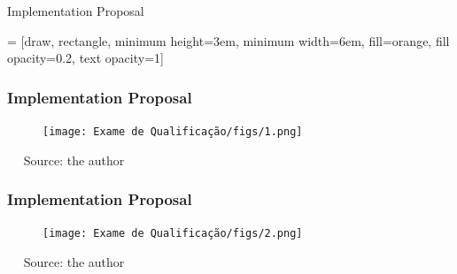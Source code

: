 \documentclass[xcolor=table]{beamer}
\begin{document}
\begin{frame}{Implementation Proposal}
	
	\centering
	
 = [draw, rectangle, 
    minimum height=3em, minimum width=6em, fill=orange, fill opacity=0.2, text opacity=1]

\end{frame}

%

\begin{frame}\frametitle{Implementation Proposal} 

	\begin{figure}[htb]
		\centering
		\texttt{[image: Exame de Qualificação/figs/1.png]}
		\label{fig:data}
	\end{figure}
	~\flushright \tiny~ {Source: the author}
\end{frame}

\begin{frame}\frametitle{Implementation Proposal} 

	\begin{figure}[htb]
		\centering
		\texttt{[image: Exame de Qualificação/figs/2.png]}
		\label{fig:model}
	\end{figure}
	~\flushright \tiny~ {Source: the author}
\end{frame}
\end{document}
